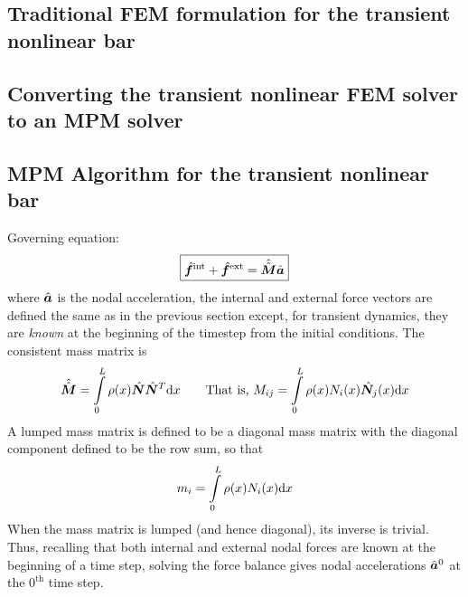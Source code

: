 













\subsection{Traditional FEM formulation for the transient nonlinear \oneD bar}
\subsection{Converting the \oneD transient nonlinear FEM solver to an MPM solver}
\subsection{MPM Algorithm for the \oneD transient nonlinear bar}

Governing equation:
\begin{equation}
 \boxed{\hat{\bm{f}}^\text{int} +  \hat{\bm{f}}^\text{ext} = \hat{\hat{\bm{M}}}\hat{\bm{a}}}
\label{eq:discrFequalMa}
\end{equation}
where $\hat{\bm{a}}$ is the nodal acceleration, the internal and external force vectors are defined the same as in the previous section except, for transient dynamics, they are \emph{known} at the beginning of the timestep from the initial conditions.  The consistent mass matrix is
\begin{equation}
  \hat{\hat{\bm{M}}}=\int\limits_0^L \rho(x)\hat{\bm{N}} \hat{\bm{N}}^T \mathrm{d} x
\qquad\text{That is, }
  M_{ij}=\int\limits_0^L \rho(x){N}_i(x) \hat{\bm{N}}_j(x) \mathrm{d} x
\end{equation}
A lumped mass matrix is defined to be a diagonal mass matrix with the \ith diagonal component defined to be the \ith row sum, so that
\begin{equation}
  m_i=\int\limits_0^L \rho(x){N}_i(x) \mathrm{d} x
\end{equation}
When the mass matrix is lumped (and hence diagonal), its inverse is trivial. Thus, recalling that both internal and external nodal forces are known at the beginning of a time step, solving the force balance gives nodal accelerations $\hat{\bm{a}}^0$ at the $0^\text{th}$ time step.  

